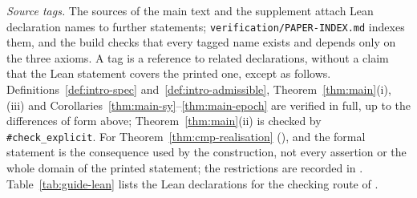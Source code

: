 \emph{Source tags.} The sources of the main text and the supplement attach Lean declaration names to further
statements; \texttt{verification/PAPER-INDEX.md} indexes them, and the build checks that every tagged name exists and
depends only on the three axioms. A tag is a reference to related declarations, without a claim that the Lean
statement covers the printed one, except as follows. Definitions~\ref{def:intro-spec} and~\ref{def:intro-admissible},
Theorem~\ref{thm:main}(i), (iii) and Corollaries~\ref{thm:main-sy}--\ref{thm:main-epoch} are verified in full, up to
the differences of form above; Theorem~\ref{thm:main}(ii) is checked by \texttt{\#check\_explicit}.
For Theorem~\ref{thm:cmp-realisation} (),  and
 the formal statement is the consequence used by the construction, not every
assertion or the whole domain of the printed statement; the restrictions are recorded in
. Table~\ref{tab:guide-lean} lists the Lean declarations for the checking route of
.

